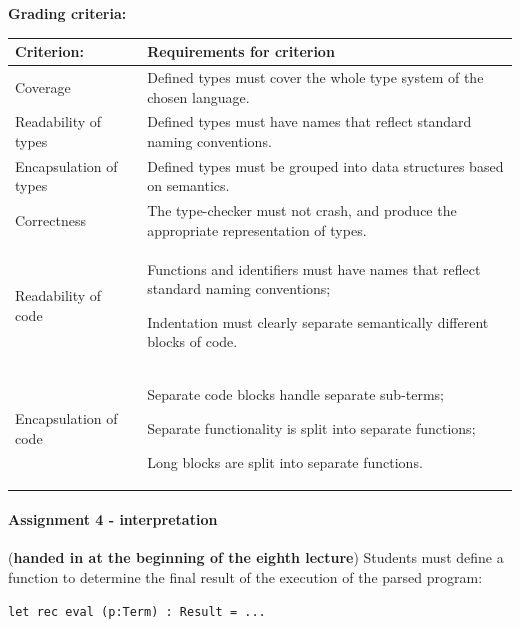 \documentclass[a4paper, 10pt]{article}
\begin{document}
			\textbf{Grading criteria:} \\
				\begin{tabularx}{\textwidth}{|>{\columncolor{lichtGrijs}} X | p{}|}
					\hline
					\textbf{Criterion:} & \textbf{Requirements for criterion} \\
					\hline
					Coverage & Defined types must cover the whole type system of the chosen language. \\
					\hline
					Readability of types & Defined types must have names that reflect standard naming conventions. \\
					\hline
					Encapsulation of types & Defined types must be grouped into data structures based on semantics. \\
					\hline
					Correctness & The type-checker must not crash, and produce the appropriate representation of types. \\
					\hline
					Readability of code & 
						\begin{inparaenum}
							\item Functions and identifiers must have names that reflect standard naming conventions;
							\item Indentation must clearly separate semantically different blocks of code.
						\end{inparaenum} \\
					\hline
					Encapsulation of code & 
						\begin{inparaenum}
							\item Separate code blocks handle separate sub-terms;
							\item Separate functionality is split into separate functions;
							\item Long blocks are split into separate functions.
						\end{inparaenum} \\
					\hline
				\end{tabularx}			

		\paragraph*{Assignment 4 - interpretation} (\textbf{handed in at the beginning of the eighth lecture})
		    Students must define a function to determine the final result of the execution of the parsed program:

			\begin{lstlisting}
let rec eval (p:Term) : Result = ...
			\end{lstlisting}
\end{document}
